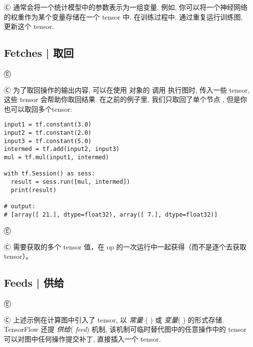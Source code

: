 Ⓒ 通常会将一个统计模型中的参数表示为一组变量. 例如, 你可以将一个神经网络的权重作为某个变量存储在一个 tensor 中. 在训练过程中, 通过重复运行训练图, 更新这个 tensor.


%
\subsection{Fetches  |  取回}

Ⓔ 

Ⓒ 为了取回操作的输出内容, 可以在使用   对象的   调用 执行图时, 传入一些 tensor,这些 tensor 会帮助你取回结果. 在之前的例子里, 我们只取回了单个节点 , 但是你也可以取回多个tensor:

\begin{lstlisting}
input1 = tf.constant(3.0)
input2 = tf.constant(2.0)
input3 = tf.constant(5.0)
intermed = tf.add(input2, input3)
mul = tf.mul(input1, intermed)

with tf.Session() as sess:
  result = sess.run([mul, intermed])
  print(result)

# output:
# [array([ 21.], dtype=float32), array([ 7.], dtype=float32)]
\end{lstlisting}

Ⓔ 

Ⓒ 需要获取的多个 tensor 值，在 op 的一次运行中一起获得（而不是逐个去获取 tensor）。

%
\subsection{Feeds  |  供给}

Ⓔ 

Ⓒ 上述示例在计算图中引入了 tensor, 以  {\em 常量} ( ) 或  {\em 变量}( ) 的形式存储. TensorFlow 还提  {\em 供给}( {\em feed}) 机制, 该机制可临时替代图中的任意操作中的 tensor 可以对图中任何操作提交补丁, 直接插入一个 tensor.


